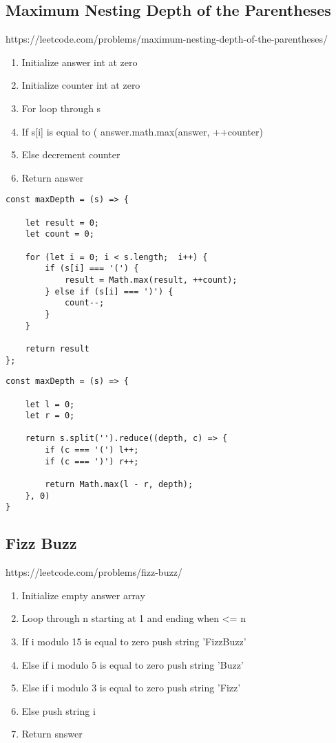 \documentclass[10pt]{article}
\begin{document}
\pagebreak %
\medskip 
\subsection{Maximum Nesting Depth of the Parentheses}
https://leetcode.com/problems/maximum-nesting-depth-of-the-parentheses/

\begin{enumerate}
	\item Initialize answer int at zero
	\item Initialize counter int at zero
	\item For loop through s
	\item If s[i] is equal to ( answer.math.max(answer, ++counter)
	\item Else decrement counter
	\item Return answer
\end{enumerate}

\begin{lstlisting}[title=Solution maxDepth, captionpos=t]
const maxDepth = (s) => {

    let result = 0;
    let count = 0;
    
    for (let i = 0; i < s.length;  i++) {
        if (s[i] === '(') {
            result = Math.max(result, ++count);
        } else if (s[i] === ')') {
            count--;
        }  
    }
    
    return result
};
\end{lstlisting}

\begin{lstlisting}[title=Solution maxDepth with split() and reduce(), captionpos=t]
const maxDepth = (s) => {

    let l = 0;
    let r = 0;
    
    return s.split('').reduce((depth, c) => {
        if (c === '(') l++;
        if (c === ')') r++;
        
        return Math.max(l - r, depth);
    }, 0)
}
\end{lstlisting}
\medskip %





\pagebreak %
\medskip 
\subsection{Fizz Buzz}
https://leetcode.com/problems/fizz-buzz/

\begin{enumerate}
	\item Initialize empty answer array
	\item Loop through n starting at 1 and ending when <= n
	\item If i  modulo 15 is equal to zero push string 'FizzBuzz'
	\item Else if i  modulo 5 is equal to zero push string 'Buzz'
	\item Else if i  modulo 3 is equal to zero push string 'Fizz'
	\item Else push string i 
	\item Return snswer 
\end{enumerate}
\end{document}
